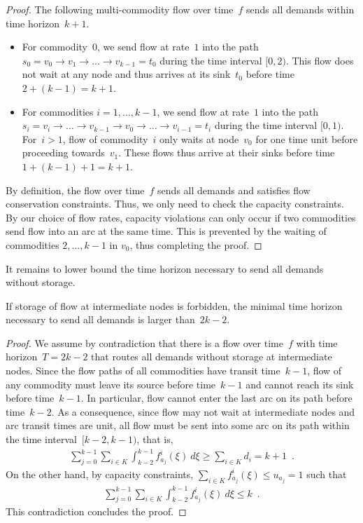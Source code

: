 \documentclass[number]{llncs}
\begin{document}
\begin{proof}
The following multi-commodity flow over time~$f$ sends all demands within time horizon~$k+1$. 
\begin{itemize}
\item For commodity~$0$, we send flow at rate~$1$ into the path $s_0=v_0\to v_1\to\dots\to v_{k-1}=t_0$ during the time interval $[0,2)$. This flow does not wait at any node and thus arrives at its sink~$t_0$ before time $2+(k-1)=k+1$.
\item For commodities $i=1,\dots,k-1$, we send flow at rate~$1$ into the path $s_i=v_i\to\dots\to v_{k-1}\to v_0\to\dots\to v_{i-1}=t_i$ during the time interval $[0,1)$. For~$i>1$, flow of commodity~$i$ only waits at node~$v_0$ for one time unit before proceeding towards~$v_1$. These flows thus arrive at their sinks before time $1+(k-1)+1=k+1$.
\end{itemize}	
By definition, the flow over time~$f$ sends all demands and satisfies flow conservation constraints. Thus, we only need to check the capacity constraints. By our choice of flow rates, capacity violations can only occur if two commodities send flow into an arc at the same time. This is prevented by the waiting of commodities $2,\dots,k-1$ in $v_0$, thus completing the proof.
\end{proof}
 
It remains to lower bound the time horizon necessary to send all demands without storage. 

\begin{lemma}
\label{lemma:upperbound}
If storage of flow at intermediate nodes is forbidden, the minimal time horizon necessary to send all demands is larger than~$2k-2$.
\end{lemma}

\begin{proof}
We assume by contradiction that there is a flow over time~$f$ with time horizon~$T=2k-2$ that routes all demands without storage at intermediate nodes. Since the flow paths of all commodities have transit time~$k-1$, flow of any commodity must leave its source before time~$k-1$ and cannot reach its sink before time~$k-1$. In particular, flow cannot enter the last arc on its path before time~$k-2$. As a consequence, since flow may not wait at intermediate nodes and arc transit times are unit, all flow must be sent into some arc on its path within the time interval~$[k-2,k-1)$, that is,
\begin{align*}
\sum_{j=0}^{k-1}\sum_{i\in K}\int_{k-2}^{k-1}f^i_{a_j}(\xi)\ d\xi \geq \sum_{i\in K}d_i = k+1\enspace.
\end{align*} 
On the other hand, by capacity constraints, $\sum_{i\in K}f^i_{a_j}(\xi)\leq u_{a_j}=1$ such that
\begin{align*}
\sum_{j=0}^{k-1}\sum_{i\in K}\int_{k-2}^{k-1}f^i_{a_j}(\xi)\ d\xi \leq k\enspace.
\end{align*}
This contradiction concludes the proof.
\end{proof}
 
\end{document}
